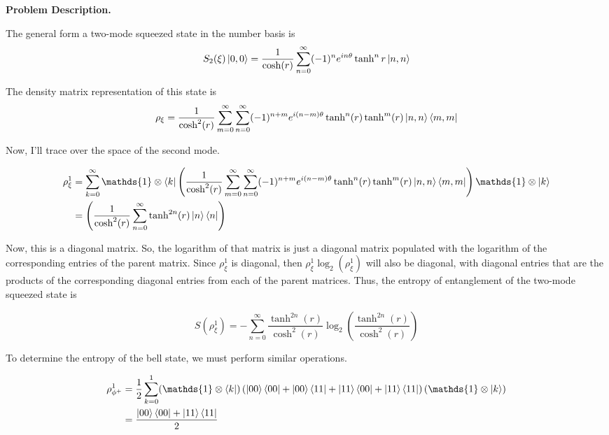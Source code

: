 \begin{homeworkProblem}

\textbf{Problem Description.}

The general form a two-mode squeezed state in the number basis is
\[
   S_{2}(\xi)\ket{0,0} = \frac{1}{\cosh(r)}
   \sum^{\infty}_{n=0} (-1)^{n} e^{i n \theta} \tanh^{n}r \ket{n,n}
\]

The density matrix representation of this state is
\[
   \rho_{\xi} = \frac{1}{\cosh^{2}(r)} \sum^{\infty}_{m=0} \sum^{\infty}_{n=0}
   (-1)^{n+m}e^{i (n-m) \theta} \tanh^{n}(r) \tanh^{m}(r) \ket{n,n}\bra{m,m}
\]

Now, I'll trace over the space of the second mode.

\begin{align}
   \rho_{\xi}^{1} &= \sum^{\infty}_{k = 0} \mathds{1} \otimes \bra{k}
   \left(
   \frac{1}{\cosh^{2}(r)} \sum^{\infty}_{m=0} \sum^{\infty}_{n=0}
   (-1)^{n+m}e^{i (n-m) \theta} \tanh^{n}(r) \tanh^{m}(r) \ket{n,n}\bra{m,m}
   \right)
   \mathds{1} \otimes \ket{k} \\
   &=
   \left(
   \frac{1}{\cosh^{2}(r)} \sum^{\infty}_{n=0} \tanh^{2n}(r) \ket{n}\bra{n}
   \right)
\end{align}

Now, this is a diagonal matrix. So, the logarithm of that matrix is just a
diagonal matrix populated with the logarithm of the corresponding entries of the
parent matrix. Since $ \rho_{\xi}^{1} $ is diagonal, then $ \rho_{\xi}^{1}
\log_{2}(\rho_{\xi}^{1}) $ will also be diagonal, with diagonal entries that are
the products of the corresponding diagonal entries from each of the parent
matrices. Thus, the entropy of entanglement of the two-mode squeezed state is

\[
   S(\rho_{\xi}^{1}) = -\sum^{\infty}_{n=0} \frac{\tanh^{2n}(r)}{\cosh^{2}(r)}
   \log_{2}\left(\frac{\tanh^{2n}(r)}{\cosh^{2}(r)}\right)
\]


To determine the entropy of the bell state, we must perform similar operations.

\begin{align}
   \rho_{\phi^{+}}^{1} &= \frac{1}{2} \sum^{1}_{k=0}
   (\mathds{1} \otimes \bra{k})
   \left( \ket{00}\bra{00} + \ket{00}\bra{11} +
   \ket{11}\bra{00} + \ket{11}\bra{11} \right)
   (\mathds{1} \otimes \ket{k}) \\
   &= \frac{\ket{00}\bra{00} + \ket{11}\bra{11}}{2}
\end{align}


\end{homeworkProblem}
